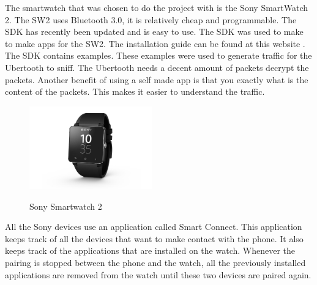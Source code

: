 \label{subsec:sw2}
The smartwatch that was chosen to do the project with is the Sony SmartWatch 2. The SW2 uses Bluetooth 3.0, it is relatively cheap and programmable. The SDK has recently been updated and is easy to use. The SDK was used to make to make apps for the SW2. The installation guide can be found at this website \cite{sw2install}. The SDK contains examples. These examples were used to generate traffic for the Ubertooth to sniff. The Ubertooth needs a decent amount of packets decrypt the packets. Another benefit of using a self made app is that you exactly what is the content of the packets. This makes it easier to understand the traffic.
\begin{figure}[!h]
  \begin{center}
	\includegraphics[width=200px]{images/sw2.jpg}
	\label{fig:sw2}
	\caption{Sony Smartwatch 2}
  \end{center}
\end{figure}
\newpage
All the Sony devices use an application called Smart Connect. This application keeps track of all the devices that want to make contact with the phone. It also keeps track of the applications that are installed on the watch. Whenever the pairing is stopped between the phone and the watch, all the previously installed applications are removed from the watch until these two devices are paired again.
